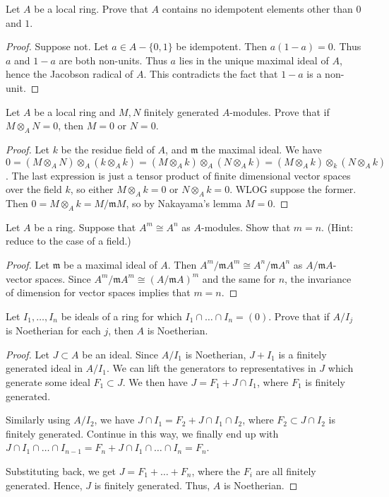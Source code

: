 \documentclass{article}
\begin{document}
 Let $A$ be a local ring.  Prove that $A$ contains no idempotent elements other than $0$ and $1$.
\begin{proof}
Suppose not.  Let $a \in A - \{0,1\}$ be idempotent.  Then $a(1-a) = 0$.  Thus $a$ and $1-a$ are both non-units. Thus $a$ lies in the unique maximal ideal of $A$, hence the Jacobson radical of $A$.  This contradicts the fact that $1-a$ is a non-unit.
\end{proof}

 Let $A$ be a local ring and $M,N$ finitely generated $A$-modules. Prove that if $M \otimes_A  N = 0$, then $M = 0$ or $N = 0$.
\begin{proof}
Let $k$ be the residue field of $A$, and $\mathfrak{m}$ the maximal ideal.  We have $0 = (M \otimes_A N) \otimes_A (k \otimes_A k) = (M \otimes_A k) \otimes_A (N \otimes_A k) = (M \otimes_A k) \otimes_k (N \otimes_A k)$.  The last expression is just a tensor product of finite dimensional vector spaces over the field $k$, so either $M \otimes_A k = 0$ or $N \otimes_A k = 0$.  WLOG suppose the former. Then $0 = M \otimes_A k = M/\mathfrak{m}M$, so by Nakayama's lemma $M = 0$.
\end{proof}

 Let $A$ be a ring. Suppose that $A^m \cong A^n$ as $A$-modules.  Show that $m = n$. (Hint: reduce to the case of a field.)
\begin{proof}
Let $\mathfrak{m}$ be a maximal ideal of $A$.  Then $A^m/\mathfrak{m}A^m \cong A^n/\mathfrak{m}A^n$ as $A/\mathfrak{m}A$-vector spaces. Since $A^m/\mathfrak{m}A^m \cong (A/\mathfrak{m}A)^m$ and the same for $n$, the invariance of dimension for vector spaces implies that $m = n$.
\end{proof}


 Let $I_1, \ldots, I_n$ be ideals of a ring for which $I_1 \cap \ldots \cap I_n = (0)$. Prove that if $A/I_j$ is Noetherian for each $j$, then $A$ is Noetherian.
\begin{proof}
Let $J \subset A$ be an ideal. Since $A/I_1$ is Noetherian, $J + I_1$ is a finitely generated ideal in $A/I_1$.  We can lift the generators to representatives in $J$ which generate some ideal $F_1 \subset J$.  We then have $J = F_1 + J \cap I_1$, where $F_1$ is finitely generated.

Similarly using $A/I_2$, we have $J \cap I_1 = F_2 + J \cap I_1 \cap I_2$, where $F_2 \subset J \cap I_2$  is finitely generated.  Continue in this way, we finally end up with $J \cap I_1 \cap \ldots \cap I_{n-1} = F_{n} + J \cap I_1 \cap \ldots \cap I_{n} = F_{n}$.

Substituting back, we get $J = F_1 + \ldots + F_{n}$, where the $F_i$ are all finitely generated.  Hence, $J$ is finitely generated.  Thus, $A$ is Noetherian.
\end{proof}
\end{document}
